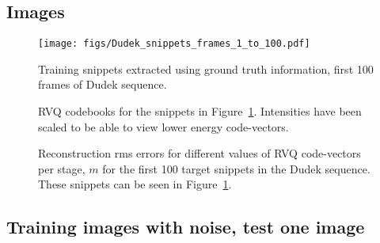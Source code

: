 \clearpage
\newpage
\subsection{Images}
								\begin{figure}[h]
								\centering
								\texttt{[image: figs/Dudek\_snippets\_frames\_1\_to\_100.pdf]}
								\caption{Training snippets extracted using ground truth information, first 100 frames of Dudek sequence.}
								\label{fig:Dudek_1_to_100}
								\end{figure}	

								\begin{figure}[h]
								\centering
								\caption{RVQ codebooks for the snippets in Figure~\ref{fig:Dudek_1_to_100}.  Intensities have been scaled to be able to view lower energy code-vectors.}
								\label{fig:RVQ_Dudek_codebook}
								\end{figure}


								\begin{figure}
								\centering
								\subtable{\begin{tiny}\end{tiny}}
								\caption{Reconstruction rms errors for different values of RVQ code-vectors per stage, $m$ for the first 100 target snippets in the Dudek sequence.  These snippets can be seen in Figure~\ref{fig:Dudek_1_to_100}.}
								\label{fig:aRVQ_Dudek_first_100}
								\end{figure}

\clearpage
\newpage
\subsection{Training images with noise, test one image}


